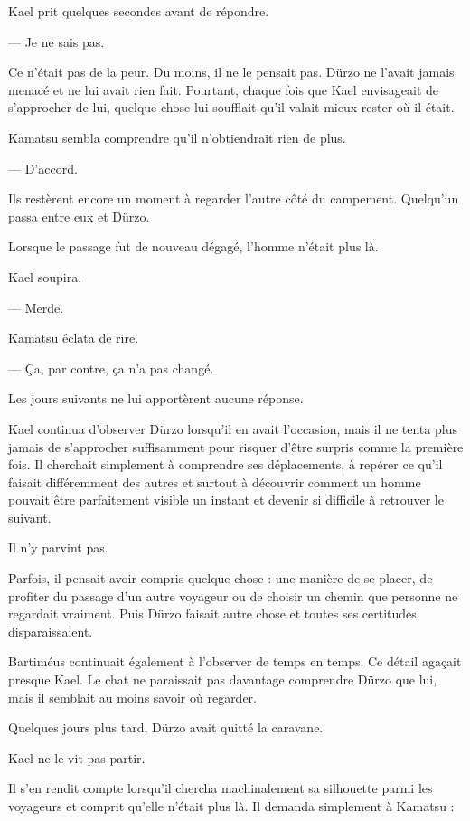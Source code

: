 Kael prit quelques secondes avant de répondre.

— Je ne sais pas.

Ce n'était pas de la peur. Du moins, il ne le pensait pas. Dürzo ne l'avait
jamais menacé et ne lui avait rien fait. Pourtant, chaque fois que Kael
envisageait de s'approcher de lui, quelque chose lui soufflait qu'il valait
mieux rester où il était.

Kamatsu sembla comprendre qu'il n'obtiendrait rien de plus.

— D'accord.

Ils restèrent encore un moment à regarder l'autre côté du campement. Quelqu'un
passa entre eux et Dürzo.

Lorsque le passage fut de nouveau dégagé, l'homme n'était plus là.

Kael soupira.

— Merde.

Kamatsu éclata de rire.

— Ça, par contre, ça n'a pas changé.

\scenebreak

Les jours suivants ne lui apportèrent aucune réponse.

Kael continua d'observer Dürzo lorsqu'il en avait l'occasion, mais il ne tenta
plus jamais de s'approcher suffisamment pour risquer d'être surpris comme la
première fois. Il cherchait simplement à comprendre ses déplacements, à repérer
ce qu'il faisait différemment des autres et surtout à découvrir comment un
homme pouvait être parfaitement visible un instant et devenir si difficile à
retrouver le suivant.

Il n'y parvint pas.

Parfois, il pensait avoir compris quelque chose : une manière de se placer, de
profiter du passage d'un autre voyageur ou de choisir un chemin que personne ne
regardait vraiment. Puis Dürzo faisait autre chose et toutes ses certitudes
disparaissaient.

Bartiméus continuait également à l'observer de temps en temps. Ce détail
agaçait presque Kael. Le chat ne paraissait pas davantage comprendre Dürzo que
lui, mais il semblait au moins savoir où regarder.

Quelques jours plus tard, Dürzo avait quitté la caravane.

Kael ne le vit pas partir.

Il s'en rendit compte lorsqu'il chercha machinalement sa silhouette parmi les
voyageurs et comprit qu'elle n'était plus là. Il demanda simplement à
Kamatsu :

